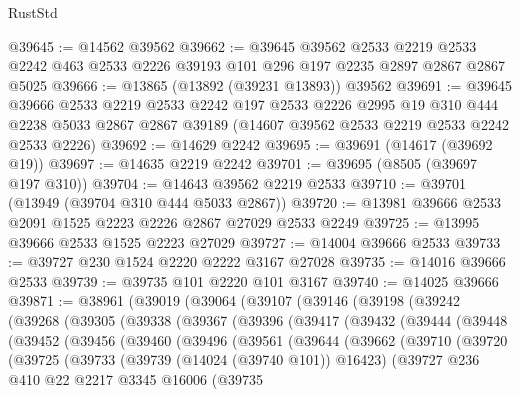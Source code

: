 \begin{lexlean}{RustStd}
\begin{coremodule}
@39645 := @14562 @39562
@39662 := @39645
    @39562
    @2533
    @2219
    @2533
    @2242
    @463
    @2533
    @2226
    @39193
    @101
    @296
    @197
    @2235
    @2897
    @2867
    @2867
    @5025
@39666 := @13865 (@13892 (@39231 @13893)) @39562
@39691 := @39645
    @39666
    @2533
    @2219
    @2533
    @2242
    @197
    @2533
    @2226
    @2995
    @19
    @310
    @444
    @2238
    @5033
    @2867
    @2867
    @39189
    (@14607 @39562 @2533 @2219 @2533 @2242 @2533 @2226)
@39692 := @14629 @2242
@39695 := @39691 (@14617 (@39692 @19))
@39697 := @14635 @2219 @2242
@39701 := @39695 (@8505 (@39697 @197 @310))
@39704 := @14643 @39562 @2219 @2533
@39710 := @39701 (@13949 (@39704 @310 @444 @5033 @2867))
@39720 := @13981 @39666 @2533 @2091 @1525 @2223 @2226 @2867 @27029 @2533 @2249
@39725 := @13995 @39666 @2533 @1525 @2223 @27029
@39727 := @14004 @39666 @2533
@39733 := @39727 @230 @1524 @2220 @2222 @3167 @27028
@39735 := @14016 @39666 @2533
@39739 := @39735 @101 @2220 @101 @3167
@39740 := @14025 @39666
@39871 := @38961
    (@39019
      (@39064
        (@39107
          (@39146
            (@39198
              (@39242
                (@39268
                  (@39305
                    (@39338
                      (@39367
                        (@39396
                          (@39417
                            (@39432
                              (@39444
                                (@39448
                                  (@39452
                                    (@39456
                                      (@39460
                                        (@39496
                                          (@39561
                                            (@39644
                                              (@39662
                                                (@39710
                                                  (@39720
                                                    (@39725
                                                      (@39733
                                                        (@39739 (@14024 (@39740 @101)) @16423)
                                                        (@39727
                                                          @236
                                                          @410
                                                          @22
                                                          @2217
                                                          @3345
                                                          @16006
                                                          (@39735

\end{coremodule}
\end{lexlean}
